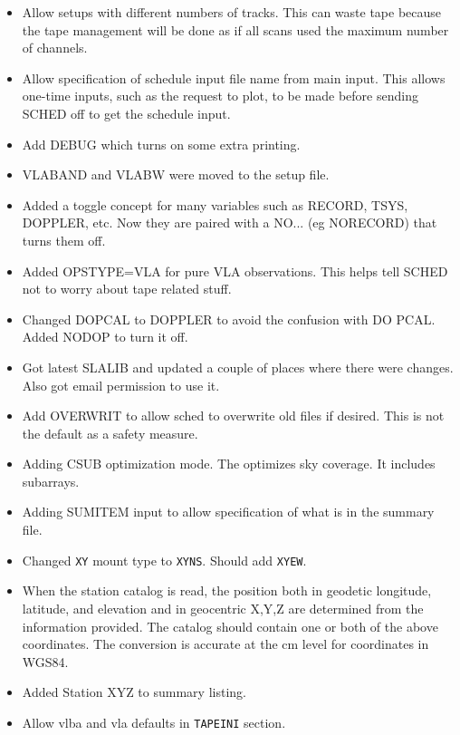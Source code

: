\documentclass{report}
\begin{document}
\begin{itemize}
\item Allow setups with different numbers of tracks.  This can waste
      tape because the tape management will be done as if all scans
      used the maximum number of channels.

\item Allow specification of schedule input file name from main input.
      This allows one-time inputs, such as the request to plot, to be
      made before sending SCHED off to get the schedule input.

\item Add DEBUG which turns on some extra printing.

\item VLABAND and VLABW were moved to the setup file.

\item Added a toggle concept for many variables such as RECORD, TSYS,
      DOPPLER, etc.  Now they are paired with a NO... (eg NORECORD)
      that turns them off.

\item Added OPSTYPE=VLA for pure VLA observations.  This helps tell
      SCHED not to worry about tape related stuff.

\item Changed DOPCAL to DOPPLER to avoid the confusion with DO PCAL.
      Added NODOP to turn it off.

\item Got latest SLALIB and updated a couple of places where there were
      changes.  Also got email permission to use it.

\item Add OVERWRIT to allow sched to overwrite old files if desired.
      This is not the default as a safety measure.

\item Adding CSUB optimization mode.  The optimizes sky coverage.
      It includes subarrays.

\item Adding SUMITEM input to allow specification of what is in the
      summary file.

\item Changed {\tt XY} mount type to {\tt XYNS}.  Should add
      {\tt XYEW}.

\item When the station catalog is read, the position both in geodetic
      longitude, latitude, and elevation and in geocentric X,Y,Z
      are determined from the information provided.  The catalog
      should contain one or both of the above coordinates.  The
      conversion is accurate at the cm level for coordinates in
      WGS84.

\item Added Station XYZ to summary listing.

\item Allow vlba and vla defaults in {\tt TAPEINI} section.

\end{itemize}
\end{document}
